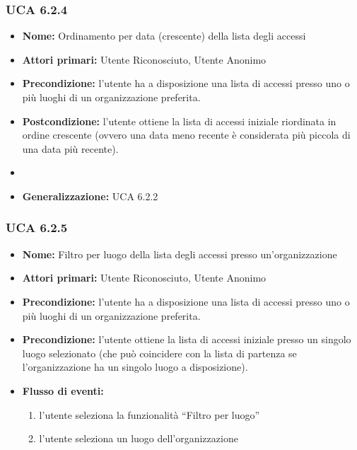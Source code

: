 \subsubsection{UCA 6.2.4}
\begin{itemize}
    \item \textbf{Nome:} Ordinamento per data (crescente) della lista degli accessi
    \item \textbf{Attori primari:} Utente Riconosciuto, Utente Anonimo
    \item \textbf{Precondizione:} l’utente ha a disposizione una lista di accessi presso uno o più luoghi di un organizzazione preferita.
    \item \textbf{Postcondizione:} l’utente ottiene la lista di accessi iniziale riordinata in ordine crescente (ovvero una data meno recente è considerata più piccola di una data più recente).
    \item \item \textbf{Generalizzazione:} UCA 6.2.2
\end{itemize}

\subsubsection{UCA 6.2.5}
\begin{itemize}
    \item \textbf{Nome:} Filtro per luogo della lista degli accessi presso un’organizzazione
    \item \textbf{Attori primari:} Utente Riconosciuto, Utente Anonimo
    \item \textbf{Precondizione:} l’utente ha a disposizione una lista di accessi presso uno o più luoghi di un organizzazione preferita.
    \item \textbf{Precondizione:} l’utente ottiene la lista di accessi iniziale presso un singolo luogo selezionato (che può coincidere con la lista di partenza se l’organizzazione ha un singolo luogo a disposizione).
    \item \textbf{Flusso di eventi:}
    \begin{enumerate}
        \item l’utente seleziona la funzionalità “Filtro per luogo”
        \item l’utente seleziona un luogo dell’organizzazione
    \end{enumerate}
\end{itemize}